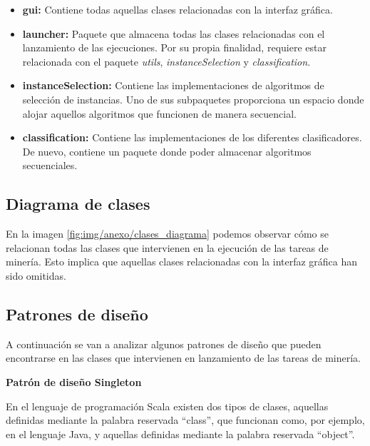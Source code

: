 
\begin{itemize}
\item \textbf{gui:} Contiene todas aquellas clases relacionadas con la interfaz gráfica. 
\item \textbf{launcher:} Paquete que almacena todas las clases relacionadas con el lanzamiento de las ejecuciones. Por su propia finalidad, requiere estar relacionada con el paquete \textit{utils}, \textit{instanceSelection} y \textit{classification}.
\item \textbf{instanceSelection:} Contiene las implementaciones de algoritmos de selección de instancias. Uno de sus subpaquetes proporciona un espacio donde alojar aquellos algoritmos que funcionen de manera secuencial.
\item \textbf{classification:} Contiene las implementaciones de los diferentes clasificadores. De nuevo, contiene un paquete donde poder almacenar algoritmos secuenciales.
\end{itemize}

\subsection{Diagrama de clases}

En la imagen \ref{fig:img/anexo/clases_diagrama} podemos observar cómo se relacionan todas las clases que intervienen en la ejecución de las tareas de minería. Esto implica que aquellas clases relacionadas con la interfaz gráfica han sido omitidas.



\subsection{Patrones de diseño}

A continuación se van a analizar algunos patrones de diseño que pueden encontrarse en las clases que intervienen en lanzamiento de las tareas de minería.

\textbf{Patrón de diseño Singleton}

En el lenguaje de programación Scala existen dos tipos de clases, aquellas definidas mediante la palabra reservada ``class'', que funcionan como, por ejemplo, en el lenguaje Java, y aquellas definidas mediante la palabra reservada ``object''.

